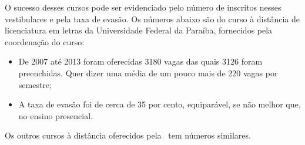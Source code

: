O sucesso desses cursos pode ser evidenciado pelo n{\' u}mero de inscritos nesses vestibulares e pela taxa de 
evas{\~ a}o. Os n{\' u}meros abaixo s{\~ a}o do curso {\` a} dist{\^ a}ncia de licenciatura em letras da Universidade Federal da Para{\' i}ba, fornecidos pela 
coordena{\c c}{\~ a}o do curso:
\begin{itemize}
 \item De 2007 at{\' e} 2013 foram oferecidas 3180 vagas das quais 3126 foram preenchidas. 
 Quer dizer uma m{\' e}dia de um pouco mais de 220 vagas por semestre;
 
 \item A taxa de evas{\~ a}o  foi de cerca de 
35 por cento, equipar{\' a}vel, se n{\~ a}o melhor que, no ensino presencial.
\end{itemize}
 Os outros cursos {\` a} dist{\^ a}ncia oferecidos pela \ufpb\  tem n{\' u}meros similares.

 

